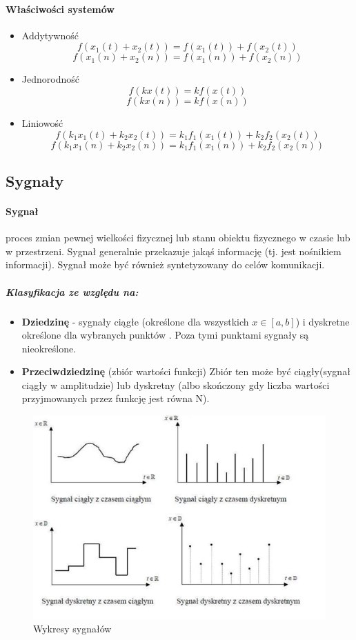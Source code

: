 \documentclass[a4paper,twoside]{report}
\begin{document}
\paragraph{Właściwości systemów}
\begin{itemize}
\item Addytywność
\[f(x_1(t)+x_2(t))=f(x_1(t))+f(x_2(t))\]
\[f(x_1(n)+x_2(n))=f(x_1(n))+f(x_2(n))\]
\item Jednorodność
\[f(kx(t))=kf(x(t))\]
\[f(kx(n))=kf(x(n))\]
\item Liniowość
\[f(k_1x_1(t)+k_2x_2(t))=k_1f_1(x_1(t))+k_2f_2(x_2(t))\]
\[f(k_1x_1(n)+k_2x_2(n))=k_1f_1(x_1(n))+k_2f_2(x_2(n))\]
\end{itemize}

\subsection{Sygnały}
\paragraph{Sygnał}proces zmian pewnej wielkości fizycznej lub stanu obiektu fizycznego w czasie lub w przestrzeni. Sygnał generalnie przekazuje jakąś informację (tj. jest nośnikiem informacji). Sygnał może być również syntetyzowany do celów komunikacji. 

\subparagraph{Klasyfikacja ze względu na:}
\begin{itemize}
\item \textbf{Dziedzinę} - sygnały ciągłe (określone dla wszystkich $x\in [a,b]$) i dyskretne określone dla wybranych punktów . Poza tymi punktami sygnały są nieokreślone. 
\item \textbf{Przeciwdziedzinę} (zbiór wartości funkcji) Zbiór ten może być ciągły(sygnał ciągły w amplitudzie) lub dyskretny (albo skończony gdy liczba wartości przyjmowanych przez funkcję jest równa N).  
\end{itemize}

\begin{figure}[htbp]
\centering
\includegraphics[scale=0.6]{obrazy/wykresy_sygnaly.png}
\caption{Wykresy sygnałów}
\end{figure}
\end{document}
